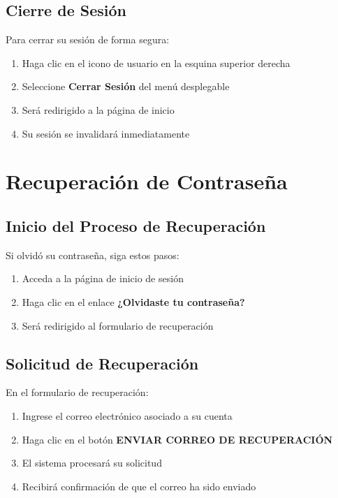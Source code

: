 \documentclass[11pt,a4paper,twoside]{book}
\begin{document}
\section{Cierre de Sesión}

Para cerrar su sesión de forma segura:

\begin{enumerate}
    \item Haga clic en el icono de usuario en la esquina superior derecha
    \item Seleccione \textbf{Cerrar Sesión} del menú desplegable
    \item Será redirigido a la página de inicio
    \item Su sesión se invalidará inmediatamente
\end{enumerate}

\chapter{Recuperación de Contraseña}

\section{Inicio del Proceso de Recuperación}

Si olvidó su contraseña, siga estos pasos:

\begin{enumerate}
    \item Acceda a la página de inicio de sesión
    \item Haga clic en el enlace \textbf{¿Olvidaste tu contraseña?}
    \item Será redirigido al formulario de recuperación
\end{enumerate}

\section{Solicitud de Recuperación}

En el formulario de recuperación:

\begin{enumerate}
    \item Ingrese el correo electrónico asociado a su cuenta
    \item Haga clic en el botón \textbf{ENVIAR CORREO DE RECUPERACIÓN}
    \item El sistema procesará su solicitud
    \item Recibirá confirmación de que el correo ha sido enviado
\end{enumerate}
\end{document}
